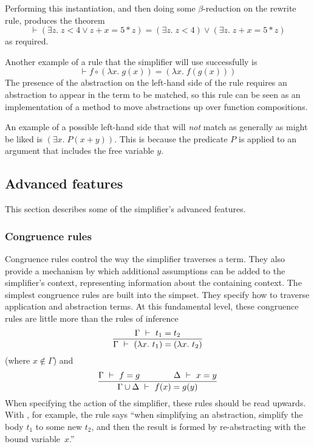 Performing this instantiation, and then doing some $\beta$-reduction
on the rewrite rule, produces the theorem\[
\vdash (\exists z. \;z < 4 \lor z + x = 5 * z) =
(\exists z. \;z < 4) \lor (\exists z.\;z + x = 5 * z)
\]
as required.

Another example of a rule that the simplifier will use successfully is
\[
\vdash f \circ (\lambda x.\; g(x)) = (\lambda x.\;f(g(x)))
\]
The presence of the abstraction on the left-hand side of the rule
requires an abstraction to appear in the term to be matched, so this
rule can be seen as an implementation of a method to move abstractions
up over function compositions.

An example of a possible left-hand side that will \emph{not} match as
generally as might be liked is $(\exists x.\;P(x + y))$.  This is
because the predicate $P$ is applied to an argument that includes the
free variable $y$.

\subsection{Advanced features}
\label{sec:advanced-simplifier}

This section describes some of the simplifier's advanced features.

\subsubsection{Congruence rules}
\label{sec:simp-congruences}
Congruence rules control the way the simplifier traverses a term.
They also provide a mechanism by which additional assumptions can be
added to the simplifier's context, representing information about the
containing context.  The simplest congruence rules are built into the
 simpset.  They specify how to traverse application and
abstraction terms.  At this fundamental level, these congruence rules
are little more than the rules of inference 
\[
\frac{\Gamma \ \vdash\  t_1 = t_2}
{\Gamma \ \vdash\  (\lambda x.\ t_1) = (\lambda x.\ t_2)}
\]
(where $x\not\in\Gamma$) and 
\[
\frac{\Gamma \ \vdash\  f = g \qquad \qquad \Delta \ \vdash\  x = y}
{\Gamma \cup \Delta \ \vdash\  f(x) = g(y)}
\]
When specifying the action of the simplifier, these rules should be
read upwards.  With , for example, the rule says ``when
simplifying an abstraction, simplify the body $t_1$ to some new $t_2$,
and then the result is formed by re-abstracting with the bound
variable~$x$.''

